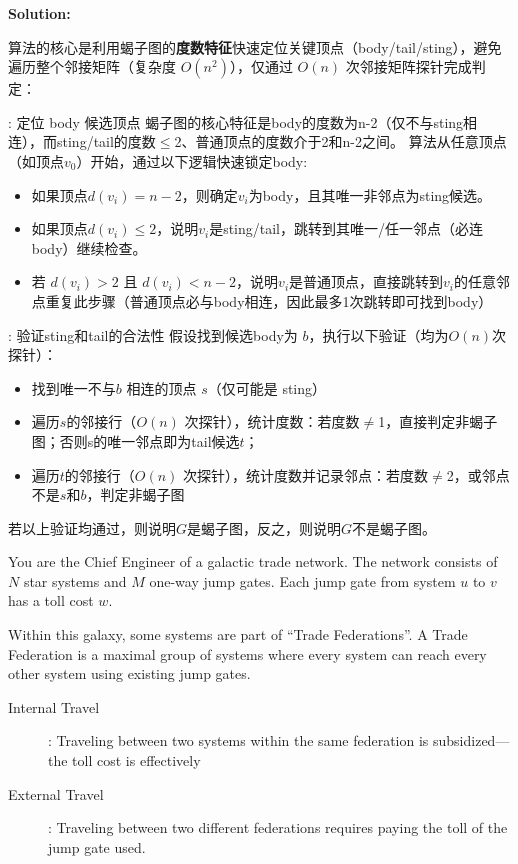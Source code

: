 \documentclass{article}
\newcounter{exercise}
\newcommand{\solution}{
    \vspace{0.2in}
    \noindent
    {\bf Solution:}
    }
\newcommand{\<}{
    \langle}
\renewcommand{\>}{
    \rangle}
\begin{document}
{\solution{
算法的核心是利用蝎子图的\textbf{度数特征}快速定位关键顶点（body/tail/sting），避免遍历整个邻接矩阵（复杂度 $O(n^2)$），仅通过 $O(n)$ 次邻接矩阵探针完成判定：
\begin{description}
\item[1]: 定位 body 候选顶点
蝎子图的核心特征是body的度数为n-2（仅不与sting相连），而sting/tail的度数$\leq$2、普通顶点的度数介于2和n-2之间。
算法从任意顶点（如顶点$v_0$）开始，通过以下逻辑快速锁定body:
\begin{itemize}
    \item 如果顶点$d(v_i) = n-2$，则确定$v_i$为body，且其唯一非邻点为sting候选。
    \item 如果顶点$d(v_i) \leq 2$，说明$v_i$是sting/tail，跳转到其唯一/任一邻点（必连body）继续检查。
    \item 若 $d(v_i) > 2$ 且 $d(v_i) < n-2$，说明$v_i$是普通顶点，直接跳转到$v_i$的任意邻点重复此步骤（普通顶点必与body相连，因此最多1次跳转即可找到body）
\end{itemize}
\item[2]: 验证sting和tail的合法性
假设找到候选body为 $b$，执行以下验证（均为$O(n)$次探针）：
\begin{itemize}
    \item 找到唯一不与$b$ 相连的顶点 $s$（仅可能是 sting）
    \item 遍历$s$的邻接行（$O(n)$ 次探针），统计度数：若度数$\neq$1，直接判定非蝎子图；否则s的唯一邻点即为tail候选$t$；
    \item 遍历$t$的邻接行（$O(n)$ 次探针），统计度数并记录邻点：若度数$\neq$2，或邻点不是$s$和$b$，判定非蝎子图
\end{itemize}
\item
若以上验证均通过，则说明$G$是蝎子图，反之，则说明$G$不是蝎子图。
\end{description}

}


\begin{exercise}
You are the Chief Engineer of a galactic trade network. The network consists of $N$ star systems and $M$ one-way jump gates. Each jump gate from system $u$ to $v$ has a toll cost $w$.

Within this galaxy, some systems are part of ``Trade Federations''. A Trade Federation is a maximal group of systems where every system can reach every other system using existing jump gates.

\begin{description}
\item[Internal Travel]: Traveling between two systems within the same federation is subsidized—the toll cost is effectively
\item[External Travel]: Traveling between two different federations requires paying the toll of the jump gate used.
\end{description}


\end{exercise}}
\end{document}
